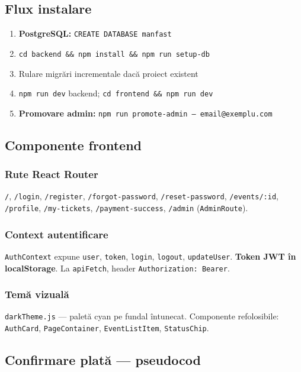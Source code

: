 \subsection{Flux instalare}

\begin{enumerate}
	\item \textbf{PostgreSQL:} \texttt{CREATE DATABASE manfast}
	\item \texttt{cd backend \&\& npm install \&\& npm run setup-db}
	\item Rulare migr\u ari incrementale dac\u a proiect existent
	\item \texttt{npm run dev} backend; \texttt{cd frontend \&\& npm run dev}
	\item \textbf{Promovare admin:} \texttt{npm run promote-admin -- email@exemplu.com}
\end{enumerate}

\subsection{Componente frontend}

\subsubsection{Rute React Router}
\texttt{/}, \texttt{/login}, \texttt{/register}, \texttt{/forgot-password}, \texttt{/reset-password}, \texttt{/events/:id}, \texttt{/profile}, \texttt{/my-tickets}, \texttt{/payment-success}, \texttt{/admin} (\texttt{AdminRoute}).

\subsubsection{Context autentificare}
\texttt{AuthContext} expune \texttt{user}, \texttt{token}, \texttt{login}, \texttt{logout}, \texttt{updateUser}. \textbf{Token JWT \^in localStorage}. La \texttt{apiFetch}, header \texttt{Authorization: Bearer}.

\subsubsection{Tem\u a vizual\u a}
\texttt{darkTheme.js} --- palet\u a cyan pe fundal \^intunecat. Componente refolosibile: \texttt{AuthCard}, \texttt{PageContainer}, \texttt{EventListItem}, \texttt{StatusChip}.


\subsection{Confirmare plat\u a --- pseudocod}

